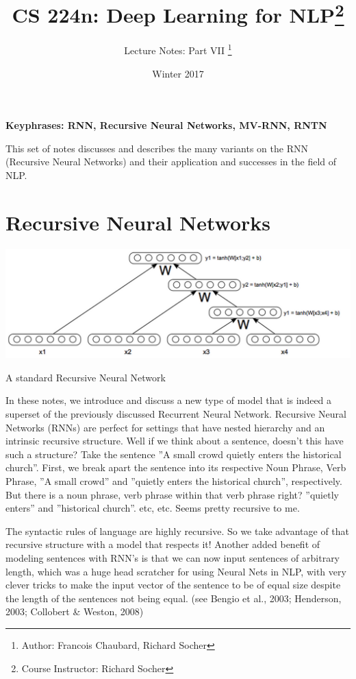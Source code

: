 \documentclass{tufte-handout}
\title{CS 224n: Deep Learning for NLP\thanks{Course Instructor: Richard Socher}}
\author[Francois Chaubard, Richard Socher]{Lecture Notes: Part VII \thanks{Author: Francois Chaubard, Richard Socher}}
\date{Winter 2017} %
\begin{document}
\maketitle%



\textbf{Keyphrases: RNN, Recursive Neural Networks, MV-RNN, RNTN}

This set of notes discusses and describes the many variants on the RNN (Recursive Neural Networks) and their application and successes in the field of NLP.

\section{Recursive Neural Networks}\label{sec:rnns}

\begin{marginfigure}%
  \includegraphics[width=\linewidth]{img1}
  \caption{A standard Recursive Neural Network }
  \label{fig:img1}
\end{marginfigure}

In these notes, we introduce and discuss a new type of model that is indeed a superset of the previously discussed Recurrent Neural Network. Recursive Neural Networks (RNNs) are perfect for settings that have nested hierarchy and an intrinsic recursive structure. Well if we think about a sentence, doesn't this have such a structure? Take the sentence ''A small crowd quietly enters the historical church''. First, we break apart the sentence into its respective Noun Phrase, Verb Phrase, ''A small crowd'' and ''quietly enters the historical church'', respectively. But there is a noun phrase, verb phrase within that verb phrase right? ''quietly enters'' and ''historical church''. etc, etc. Seems pretty recursive to me. 

The syntactic rules of language are highly recursive. So we take advantage of that recursive structure with a model that respects it! Another added benefit of modeling sentences with RNN's is that we can now input sentences of arbitrary length, which was a huge head scratcher for using Neural Nets in NLP, with very clever tricks to make the input vector of the sentence to be of equal size despite the length of the sentences not being equal. (see Bengio et al., 2003; Henderson, 2003; Collobert \& Weston, 2008) 
\end{document}
